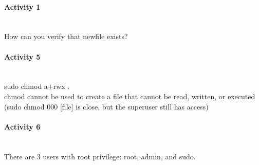 \documentclass{article}
\begin{document}
\paragraph{\Large Activity 1}\mbox{}\\
How can you verify that newfile exists?

\paragraph{\Large Activity 5}\mbox{}\\
\indent sudo chmod a+rwx .\\

chmod cannot be used to create a file that cannot be read, written, or executed
(sudo chmod 000 [file] is close, but the superuser still has access)\\

\paragraph{\Large Activity 6}\mbox{}\\
There are 3 users with root privilege: root, admin, and sudo.
	
\end{document}
